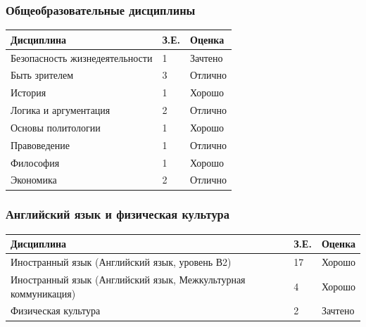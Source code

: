 \documentclass[a4paper,12pt]{article}
\begin{document}
	\subsubsection*{Общеобразовательные дисциплины}
	{\fontsize{9}{11}\selectfont
		\begin{tabular}{p{} p{} p{}}
			\toprule
			\textbf{Дисциплина} & \textbf{З.Е.} & \textbf{Оценка} \\
			\midrule
			Безопасность жизнедеятельности & 1 & Зачтено \\
			Быть зрителем & 3 & Отлично \\
			История & 1 & Хорошо \\
			Логика и аргументация & 2 & Отлично \\
			Основы политологии & 1 & Хорошо \\
			Правоведение & 1 & Отлично \\
			Философия & 1 & Хорошо\footnotemark  \\
			Экономика & 2 & Отлично \\
			\bottomrule
	\end{tabular}}

	
	\subsubsection*{Английский язык и физическая культура}
	{\fontsize{9}{11}\selectfont
	\begin{tabular}{p{} p{} p{}}
	\toprule
	\textbf{Дисциплина} & \textbf{З.Е.} & \textbf{Оценка} \\
	\midrule
	Иностранный язык (Английский язык, уровень В2) & 17 & Хорошо \\
	Иностранный язык (Английский язык, Межкультурная коммуникация) & 4 & Хорошо \\
	Физическая культура & 2 & Зачтено \\
	\bottomrule
	\end{tabular}}
	
\end{document}
